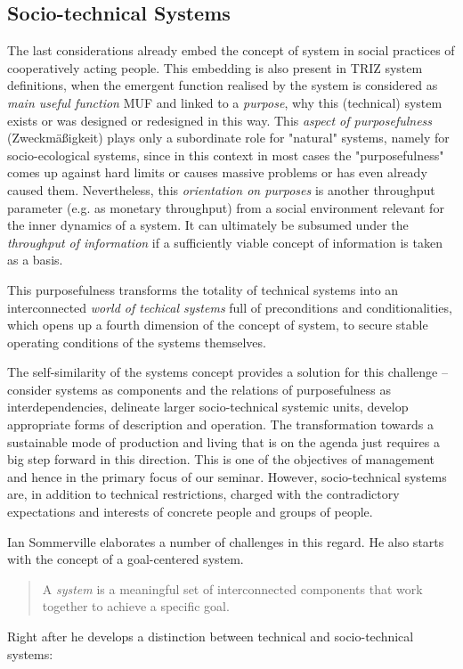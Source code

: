 \documentclass[11pt,a4paper]{article}
\begin{document}
\subsection{Socio-technical Systems}

The last considerations already embed the concept of system in social
practices of cooperatively acting people. This embedding is also present in
TRIZ system definitions, when the emergent function realised by the system is
considered as \emph{main useful function} MUF and linked to a \emph{purpose},
why this (technical) system exists or was designed or redesigned in this way.
This \emph{aspect of purposefulness} (Zweckmäßigkeit) plays only a subordinate
role for "natural" systems, namely for socio-ecological systems, since in this
context in most cases the "purposefulness" comes up against hard limits or
causes massive problems or has even already caused them. Nevertheless, this
\emph{orientation on purposes} is another throughput parameter (e.g. as
monetary throughput) from a social environment relevant for the inner dynamics
of a system.  It can ultimately be subsumed under the \emph{throughput of
  information} if a sufficiently viable concept of information is taken as a
basis. 

This purposefulness transforms the totality of technical systems into an
interconnected \emph{world of techical systems} full of preconditions and
conditionalities, which opens up a fourth dimension of the concept of system,
to secure stable operating conditions of the systems themselves.

The self-similarity of the systems concept provides a solution for this
challenge -- consider systems as components and the relations of
purposefulness as interdependencies, delineate larger socio-technical systemic
units, develop appropriate forms of description and operation. The
transformation towards a sustainable mode of production and living that is on
the agenda just requires a big step forward in this direction.  This is one of
the objectives of management and hence in the primary focus of our seminar.
However, socio-technical systems are, in addition to technical restrictions,
charged with the contradictory expectations and interests of concrete people
and groups of people.

Ian Sommerville \cite{Sommerville2015} elaborates a number of challenges in
this regard. He also starts with the concept of a goal-centered system.
\begin{quote}
  A \emph{system} is a meaningful set of interconnected components that work
  together to achieve a specific goal.  \cite{Sommerville2015}
\end{quote}
Right after he develops a distinction between technical and socio-technical
systems:
\end{document}
